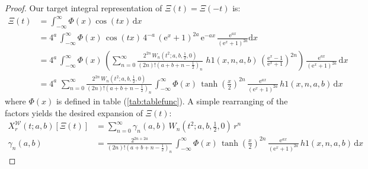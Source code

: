 \documentclass[a4paper,11pt,twoside]{amsart}
\newcommand{\verifiedeq}{=}
\newcommand{\verifiedeq}{\stackrel{\checkmark}{=}}
\begin{document}
\begin{proof}
Our target integral representation of $\Xi(t) = \Xi(-t)$ is:
\begin{align}
 \Xi(t) &\verifiedeq \int_{-\infty}^\infty \Phi(x)\cos(tx)\, \mathrm{d}x \\
 &\verifiedeq 4^a\,\int_{-\infty}^\infty \Phi(x)\,\cos(tx)\,4^{-a}\,(\mathrm{e}^x+1)^{2a}\,\mathrm{e}^{-ax} \,\frac{\mathrm{e}^{ax}}{(\mathrm{e}^x+1)^{2a}} \mathrm{d}x \\
 &\verifiedeq 4^a\,\int_{-\infty}^\infty \Phi(x)\,\left(\sum_{n=0}^\infty \frac{2^{2n}\,W_n\left(t^2;a,b,\frac12,0\right)}{(2n)!\left(a+b+n-\frac12\right)_n}\, \,h1(x,n,a,b)\,\left(\frac{\textrm{e}^{x}-1}{\textrm{e}^{x}+1}\right)^{2n}\right)\,\frac{\mathrm{e}^{ax}}{(\mathrm{e}^x+1)^{2a}}\, \mathrm{d}x \\
 &\verifiedeq 4^a\,\,\sum_{n=0}^\infty \frac{2^{2n}\,W_n\left(t^2;a,b,\frac12,0\right)}{(2n)!\left(a+b+n-\frac12\right)_n}\,\int_{-\infty}^{\infty} \Phi(x)\,\tanh\left(\frac{x}{2}\right)^{2n}\,\frac{\mathrm{e}^{ax}}{(\mathrm{e}^x+1)^{2a}}\,h1(x,n,a,b)\,\mathrm{d}x
\end{align}
where $\Phi(x)$ is defined in table (\ref{tab:tablefunc}). A simple rearranging of the factors yields the desired expansion of $\Xi(t)$:
\begin{align}
X^\mathcal{W}_r(t;a,b)\left[\Xi(t)\right] &\verifiedeq \sum_{n=0}^\infty \gamma_n(a,b)\,W_n\left(t^2;a,b,\frac12,0\right)\,r^n \\
  \gamma_n(a,b) &\verifiedeq \frac{2^{2n+2a}}{(2n)!\left(a+b+n-\frac12\right)_n}\,\int_{-\infty}^{\infty} \Phi(x)\,\tanh\left(\frac{x}{2}\right)^{2n}\,\frac{\mathrm{e}^{ax}}{(\mathrm{e}^x+1)^{2a}}\,h1(x,n,a,b)\,\mathrm{d}x
\end{align}


\end{proof}
\end{document}
